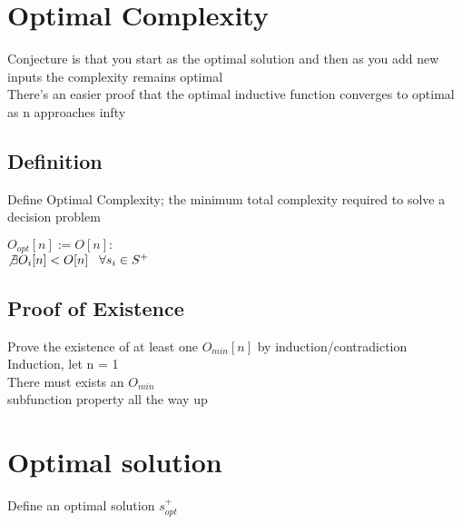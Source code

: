 \documentclass[11pt]{article}
\begin{document}
\section{Optimal Complexity}
Conjecture is that you start as the optimal solution and then as you add new inputs the complexity remains optimal\\
There's an easier proof that the optimal inductive function converges to optimal as n approaches infty

\subsection{Definition}
Define Optimal Complexity; the minimum total complexity required to solve a decision problem
\begin{center}
$O_{opt}[n] := O[n]:$
\\ \vspace{2mm}
$\not \exists O_i\lbrack n \rbrack < O[n] \hspace{3mm} \forall s_i \in S^+$
\end{center}

\subsection{Proof of Existence}
Prove the existence of at least one $O_{min}[n]$ by induction/contradiction\\
Induction, let n = 1\\
There must exists an $O_{min}$\\
subfunction property all the way up








\section{Optimal solution}
Define an optimal solution $s_{opt}^+$
\end{document}
